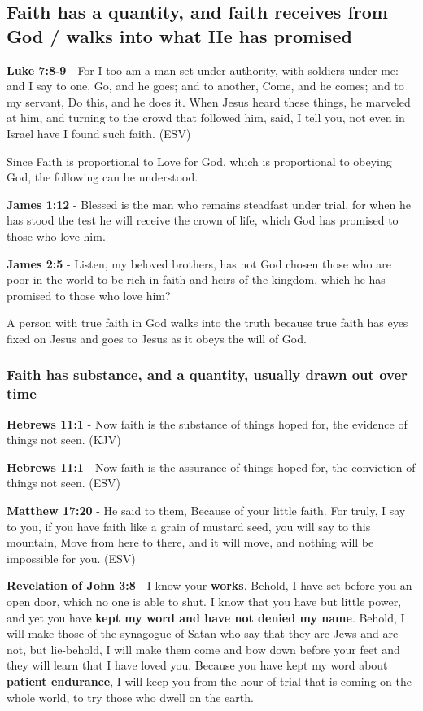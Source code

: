 \documentclass[11pt]{article}
\begin{document}
\subsection{Faith has a quantity, and faith receives from God / walks into what He has promised}
\label{sec:org7b25c7a}
\textbf{Luke 7:8-9} - For I too am a man set under authority, with soldiers under me: and I say to one, Go, and he goes; and to another, Come, and he comes; and to my servant, Do this, and he does it. When Jesus heard these things, he marveled at him, and turning to the crowd that followed him, said, I tell you, not even in Israel have I found such faith. (ESV)

Since Faith is proportional to Love for God, which is proportional to obeying God, the following can be understood.

\textbf{James 1:12} - Blessed is the man who remains steadfast under trial, for when he has stood the test he will receive the crown of life, which God has promised to those who love him.

\textbf{James 2:5} - Listen, my beloved brothers, has not God chosen those who are poor in the world to be rich in faith and heirs of the kingdom, which he has promised to those who love him?

A person with true faith in God walks into the truth because true faith has eyes fixed on Jesus and goes to Jesus as it obeys the will of God.

\subsubsection{Faith has substance, and a quantity, usually drawn out over time}
\label{sec:orge00ef22}
\textbf{Hebrews 11:1} - Now faith is the substance of things hoped for, the evidence of things not seen. (KJV)

\textbf{Hebrews 11:1} - Now faith is the assurance of things hoped for, the conviction of things not seen. (ESV)

\textbf{Matthew 17:20} - He said to them, Because of your little faith. For truly, I say to you, if you have faith like a grain of mustard seed, you will say to this mountain, Move from here to there, and it will move, and nothing will be impossible for you. (ESV)

\textbf{Revelation of John 3:8} - I know your \textbf{works}. Behold, I have set before you an open door, which no one is able to shut. I know that you have but little power, and yet you have \textbf{kept my word and have not denied my name}. Behold, I will make those of the synagogue of Satan who say that they are Jews and are not, but lie-behold, I will make them come and bow down before your feet and they will learn that I have loved you. Because you have kept my word about \textbf{patient endurance}, I will keep you from the hour of trial that is coming on the whole world, to try those who dwell on the earth.
\end{document}
